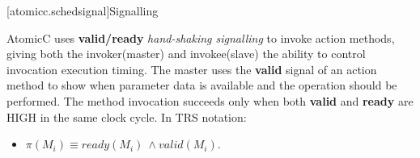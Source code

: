 
[atomicc.schedsignal]{Signalling}

AtomicC uses \textbf{valid/ready} \textit{hand-shaking signalling}
\cite{Fletcher2009, AXISpec} to invoke action methods,
giving both the invoker(master) and invokee(slave) the ability to control invocation
execution timing.
The master uses the \textbf{valid} signal
of an action method to show when parameter data is available
and the operation should be performed.
The method invocation succeeds only when
both \textbf{valid} and \textbf{ready} are HIGH in the same clock cycle.
\newline
In TRS notation\cite[p.~22]{Hoe:Thesis}:
\begin{itemize}[label= ]
\item $\pi(M_{i}) \equiv ready(M_{i})\ \wedge valid(M_{i})$.
\end{itemize}
